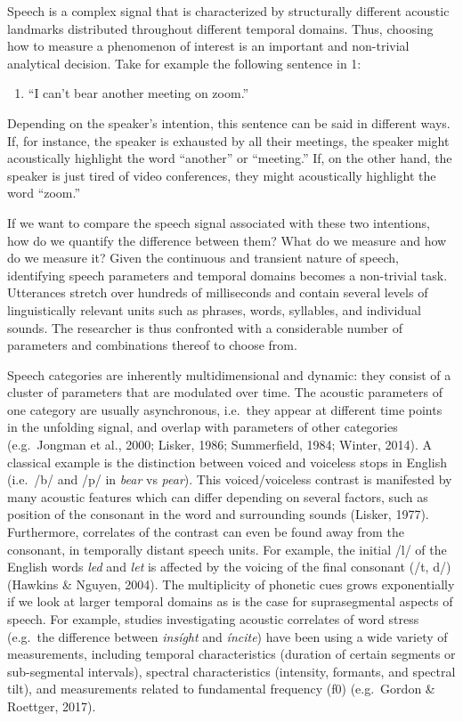 \documentclass[
  english,
  man,floatsintext]{apa6}
\providecommand{\tightlist}{%
  \setlength{\itemsep}{0pt}\setlength{\parskip}{0pt}}
\begin{document}
Speech is a complex signal that is characterized by structurally different acoustic landmarks distributed throughout different temporal domains.
Thus, choosing how to measure a phenomenon of interest is an important and non-trivial analytical decision. Take for example the following sentence in 1:

\begin{enumerate}
\def\labelenumi{(\arabic{enumi})}
\tightlist
\item
  ``I can't bear another meeting on zoom.''
\end{enumerate}

Depending on the speaker's intention, this sentence can be said in different ways.
If, for instance, the speaker is exhausted by all their meetings, the speaker might acoustically highlight the word ``another'' or ``meeting.''
If, on the other hand, the speaker is just tired of video conferences, they might acoustically highlight the word ``zoom.''

If we want to compare the speech signal associated with these two intentions, how do we quantify the difference between them? What do we measure and how do we measure it?
Given the continuous and transient nature of speech, identifying speech parameters and temporal domains becomes a non-trivial task.
Utterances stretch over hundreds of milliseconds and contain several levels of linguistically relevant units such as phrases, words, syllables, and individual sounds.
The researcher is thus confronted with a considerable number of parameters and combinations thereof to choose from.

Speech categories are inherently multidimensional and dynamic: they consist of a cluster of parameters that are modulated over time.
The acoustic parameters of one category are usually asynchronous, i.e.~they appear at different time points in the unfolding signal, and overlap with parameters of other categories (e.g.~Jongman et al., 2000; Lisker, 1986; Summerfield, 1984; Winter, 2014).
A classical example is the distinction between voiced and voiceless stops in English (i.e.~/b/ and /p/ in \emph{bear} vs \emph{pear}).
This voiced/voiceless contrast is manifested by many acoustic features which can differ depending on several factors, such as position of the consonant in the word and surrounding sounds (Lisker, 1977).
Furthermore, correlates of the contrast can even be found away from the consonant, in temporally distant speech units.
For example, the initial /l/ of the English words \emph{led} and \emph{let} is affected by the voicing of the final consonant (/t, d/) (Hawkins \& Nguyen, 2004).
The multiplicity of phonetic cues grows exponentially if we look at larger temporal domains as is the case for suprasegmental aspects of speech.
For example, studies investigating acoustic correlates of word stress (e.g.~the difference between \emph{insíght} and \emph{íncite}) have been using a wide variety of measurements, including temporal characteristics (duration of certain segments or sub-segmental intervals), spectral characteristics (intensity, formants, and spectral tilt), and measurements related to fundamental frequency (f0) (e.g.~Gordon \& Roettger, 2017).
\end{document}
